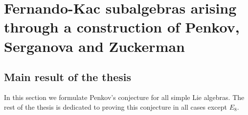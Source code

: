 \documentclass[12pt]{report}
\newcommand {\CC} {\mathbb {C}}
\renewcommand {\phi} {\varphi}
\newcommand{\sL}{\mathrm{sl}}
\newcommand{\sP}{\mathrm{sp}}
\newcommand{\gl}{\mathrm{gl}}
\begin{document}

\chapter{Fernando-Kac subalgebras arising through a construction of Penkov, Serganova and Zuckerman}\label{secTheConstruction}
\section{Main result of the thesis}
In this section we formulate Penkov's conjecture for all simple Lie algebras. The rest of the thesis is dedicated to proving this conjecture in all cases except $E_8$.
\end{document}

